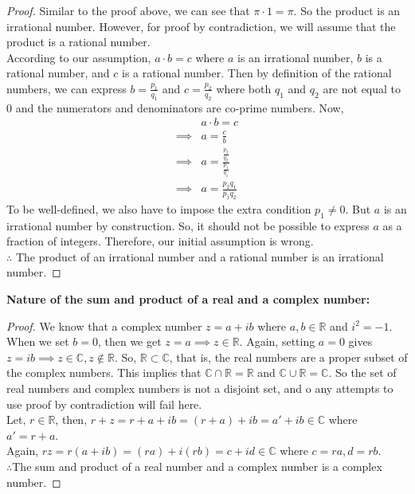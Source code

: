 \begin{proof}
    Similar to the proof above, we can see that $\pi\cdot1=\pi$. So the product is an irrational number. However, for proof by contradiction, we will assume that the product is a rational number. \\
    According to our assumption, $a\cdot b=c$ where $a$ is an irrational number, $b$ is a rational number, and $c$ is a rational number. Then by definition of the rational numbers, we can express $b=\frac{p_1}{q_1}$ and $c=\frac{p_2}{q_2}$ where both $q_1$ and $q_2$ are not equal to $0$ and the numerators and denominators are co-prime numbers. Now,
    \begin{align*}
        &a\cdot b=c\\
        \implies&a=\frac{c}{b}\\
        \implies&a=\frac{\frac{p_2}{q_2}}{\frac{p_1}{q_1}}\\
        \implies&a=\frac{p_2 q_1}{p_1 q_2}
    \end{align*}
    To be well-defined, we also have to impose the extra condition $p_1\neq 0$. But $a$ is an irrational number by construction. So, it should not be possible to express $a$ as a fraction of integers. Therefore, our initial assumption is wrong.\\
    $\therefore$ The product of an irrational number and a rational number is an irrational number.
\end{proof}
\noindent\textbf{Nature of the sum and product of a real and a complex number:}
\begin{proof}
    We know that a complex number $z=a+ib$ where $a,b\in\mathbb{R}$ and $i^2=-1$. When we set $b=0$, then we get $z=a\implies z\in\mathbb{R}$. Again, setting $a=0$ gives $z=ib\implies z\in\mathbb{C},z\notin\mathbb{R}$. So, $\mathbb{R}\subset\mathbb{C}$, that is, the real numbers are a proper subset of the complex numbers. This implies that $\mathbb{C}\cap\mathbb{R}=\mathbb{R}$ and $\mathbb{C}\cup\mathbb{R}=\mathbb{C}$. So the set of real numbers and complex numbers is not a disjoint set, and o any attempts to use proof by contradiction will fail here.\\
    Let, $r\in\mathbb{R}$, then, $r+z=r+a+ib=(r+a)+ib=a'+ib\in\mathbb{C}$ where $a'=r+a$.\\
    Again, $rz=r(a+ib)=(ra)+i(rb)=c+id\in\mathbb{C}$ where $c=ra,d=rb$.\\
    $\therefore$The sum and product of a real number and a complex number is a complex number.
\end{proof}
